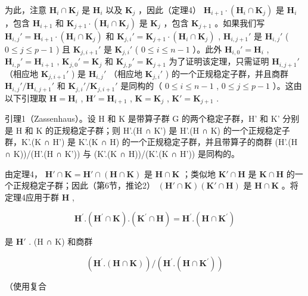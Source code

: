 为此，注意 \(\mathbf{H}_i \cap \mathbf{K}_j\) 是 \(\mathbf{H}_i\) 以及 \(\mathbf{K}_j\) ，因此（定理4） \(\mathbf{H}_{i+1} \cdot (\mathbf{H}_i \cap \mathbf{K}_j)\) 是 \(\mathbf{H}_i\) ，包含 \(\mathbf{H}_{i+1}\) 和 \(\mathbf{K}_{j+1} \cdot (\mathbf{H}_i \cap \mathbf{K}_j)\) 是 \(\mathbf{K}_j\) ，包含 \(\mathbf{K}_{j+1}\) 。如果我们写 \(\mathbf{H}_{i,j}' = \mathbf{H}_{i+1} \cdot (\mathbf{H}_i \cap \mathbf{K}_j)\) 和 \(\mathbf{K}_{j,i}' = \mathbf{K}_{j+1} \cdot (\mathbf{H}_i \cap \mathbf{K}_j)\) , \(\mathbf{H}_{i,j+1}'\) 是 \(\mathbf{H}_{i,j}'\) ( \(0 \leqslant j \leqslant p-1\) ) 且 \(\mathbf{K}_{j,i+1}'\) 是 \(\mathbf{K}_{j,i}'\) ( \(0 \leqslant i \leqslant n-1\) ）。此外 \(\mathbf{H}_{i,0}' = \mathbf{H}_i\) , \(\mathbf{H}_{i,p}' = \mathbf{H}_{i+1}\) , \(\mathbf{K}_{j,0}' = \mathbf{K}_j\) 和 \(\mathbf{K}_{j,p}' = \mathbf{K}_{j+1}\) 为了证明该定理，只需证明 \(\mathbf{H}_{i,j+1}'\) （相应地 \(\mathbf{K}_{j,i+1}'\) ) 是 \(\mathbf{H}_{i,j}'\) （相应地 \(\mathbf{K}_{j,i}'\) ) 的一个正规稳定子群，并且商群 \(\mathbf{H}_{i,j}'/\mathbf{H}_{i,j+1}'\) 和 \(\mathbf{K}_{j,i}'/\mathbf{K}_{j,i+1}'\) 是同构的（ \(0 \leqslant i \leqslant n-1\) , \(0 \leqslant j \leqslant p-1\) ）。这由以下引理取 \(\mathbf{H} = \mathbf{H}_i\) , \(\mathbf{H}' = \mathbf{H}_{i+1}\) , \(\mathbf{K} = \mathbf{K}_j\) , \(\mathbf{K}' = \mathbf{K}_{j+1}\) .

引理1（Zassenhaus）。设 H 和 K 是带算子群 G 的两个稳定子群，H' 和 K' 分别是 H 和 K 的正规稳定子群；则 H'.(H ∩ K') 是 H'.(H ∩ K) 的一个正规稳定子群，K'.(K ∩ H') 是 K'.(K ∩ H) 的一个正规稳定子群，并且带算子的商群 (H'.(H ∩ K))/(H'.(H ∩ K')) 与 (K'.(K ∩ H))/(K'.(K ∩ H')) 是同构的。

由定理4， \(\mathbf{H}' \cap \mathbf{K} = \mathbf{H}' \cap (\mathbf{H} \cap \mathbf{K})\) 是 \(\mathbf{H} \cap \mathbf{K}\) ；类似地 \(\mathbf{K}' \cap \mathbf{H}\) 是 \(\mathbf{K} \cap \mathbf{H}\) 的一个正规稳定子群；因此（第6节，推论2） \((\mathbf{H}' \cap \mathbf{K})(\mathbf{K}' \cap \mathbf{H})\) 是 \(\mathbf{H} \cap \mathbf{K}\) 。将定理4应用于群 \(\mathbf{H}\) ,

\[
\mathbf {H} ^ {\prime}. (\mathbf {H} ^ {\prime} \cap \mathbf {K}). (\mathbf {K} ^ {\prime} \cap \mathbf {H}) = \mathbf {H} ^ {\prime}. (\mathbf {H} \cap \mathbf {K} ^ {\prime})
\]

是 \(\mathbf{H}'\) . (H ∩ K) 和商群

\[
(\mathbf {H} ^ {\prime}. (\mathbf {H} \cap \mathbf {K})) / (\mathbf {H} ^ {\prime}. (\mathbf {H} \cap \mathbf {K} ^ {\prime}))
\]

（使用复合

